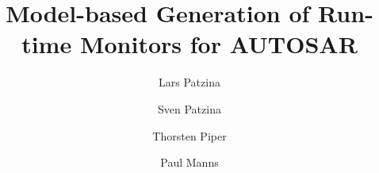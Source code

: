 
  \title{Model-based Generation of Run-time Monitors for AUTOSAR}

  \author{Lars Patzina \and Sven Patzina \and Thorsten Piper \and Paul Manns}

  
\maketitle
\clearpage
\setcounter{page}{84}